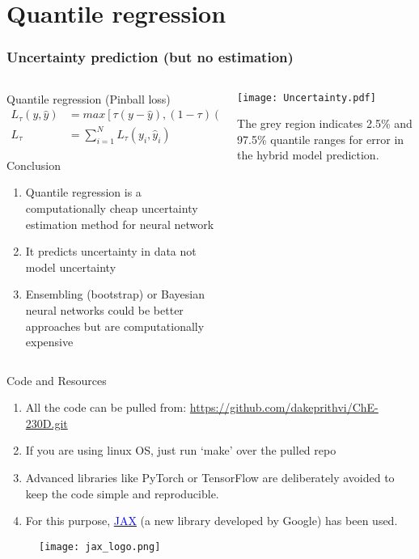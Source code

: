 \documentclass[dvipsnames, 9pt]{beamer}
\begin{document}
\section{Quantile regression}
\begin{frame}
    \frametitle{Uncertainty prediction (but no estimation)}
    
    \begin{columns}
    {   \begin{column}{0.5\textwidth}
        \begin{block}{Quantile regression (Pinball loss)}
        \begin{align*}
        L_{\tau}(y,\hat{y}) &= max[\tau (y - \hat{y}), (1  - \tau) (\hat{y} - y)] \\
        L_{\tau} &= \sum_{i=1}^N L_{\tau} (y_i,\hat{y}_i)
        \end{align*}
        \end{block}
        \begin{block}{Conclusion}
        \begin{enumerate}
        \item Quantile regression is a computationally cheap uncertainty estimation method for neural network
        \item It predicts uncertainty in data not model uncertainty
        \item Ensembling (bootstrap) or Bayesian neural networks could be better approaches but are computationally expensive
        \end{enumerate}
        \end{block}
        \end{column}}
        \begin{column}{0.5\textwidth}
        \texttt{[image: Uncertainty.pdf]}
        \begin{center}
        \scriptsize{The grey region indicates 2.5\% and 97.5\% quantile ranges for error in the hybrid model prediction.}
        \end{center}
        \end{column}
    \end{columns}
\end{frame}


\begin{frame}{Code and Resources}
\begin{enumerate}
\item All the code can be pulled from: \textcolor{blue}{\url{https://github.com/dakeprithvi/ChE-230D.git}}
\item If you are using linux OS, just run `make' over the pulled repo
\item Advanced libraries like PyTorch or TensorFlow are deliberately avoided to keep the code simple and reproducible.
\item For this purpose, \href{https://jax.readthedocs.io/en/latest/notebooks/quickstart.html}{\textcolor{blue}{JAX}} (a new library developed by Google) has been used. 
\end{enumerate}
\begin{figure}[H]
\centering
\texttt{[image: jax\_logo.png]}
\end{figure}
\end{frame}
\end{document}
